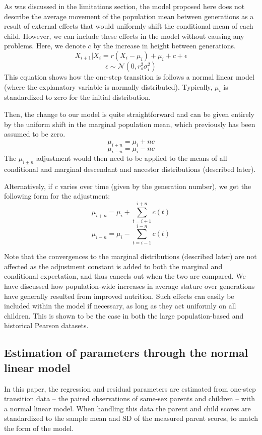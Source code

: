 \documentclass[a4paper,11pt]{article} %
\begin{document}
As was discussed in the limitations section, the model proposed here does not describe the average movement of the population mean between generations as a result of external effects that would uniformly shift the conditional mean of each child. However, we can include these effects in the model without causing any problems. Here, we denote $c$ by the increase in height between generations.
$$X_{i+1}|X_i = r(X_i - \mu_i) + \mu_i + c+ \epsilon$$
$$\epsilon \sim \mathcal{N}(0, r_s^2 \sigma_i^2)$$
This equation shows how the one-step transition is follows a normal linear model (where the explanatory variable is normally distributed). Typically, $\mu_i$ is standardized to zero for the initial distribution.

Then, the change to our model is quite straightforward and can be given entirely by the uniform shift in the marginal population mean, which previously has been assumed to be zero. 
$$\mu_{i+n} = \mu_i + nc$$
$$\mu_{i-n} = \mu_i - nc$$
The $\mu_{i \pm n}$ adjustment would then need to be applied to the means of all conditional and marginal descendant and ancestor distributions (described later). 

Alternatively, if $c$ varies over time (given by the generation number), we get the following form for the adjustment:
$$\mu_{i+n} = \mu_i + \sum_{t = i+1}^{i+n} c(t)$$
$$\mu_{i-n} = \mu_i - \sum_{t = i-1}^{i-n} c(t)$$

Note that the convergences to the marginal distributions (described later) are not affected as the adjustment constant is added to both the marginal and conditional expectation, and thus cancels out when the two are compared. We have discussed how population-wide increases in average stature over generations have generally resulted from improved nutrition. Such effects can easily be included within the model if necessary, as long as they act uniformly on all children. This is shown to be the case in both the large population-based and historical Pearson datasets. 


\subsection{Estimation of parameters through the normal linear model}

In this paper, the regression and residual parameters are estimated from one-step transition data -- the paired observations of same-sex parents and children -- with a normal linear model. When handling this data the parent and child scores are standardized to the sample mean and SD of the measured parent scores, to match the form of the model. 
\end{document}
